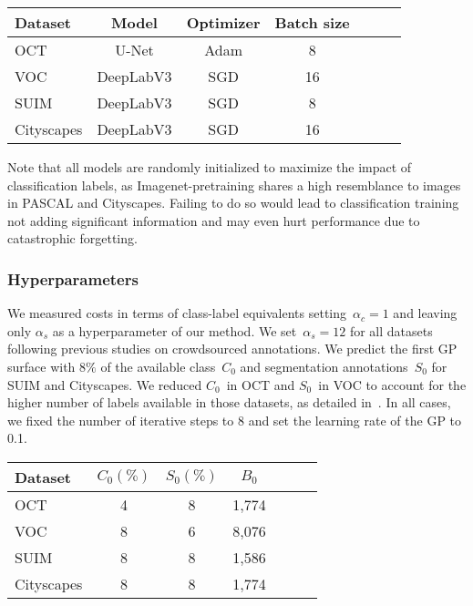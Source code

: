 \begin{table}
\centering
\begin{tabular}{lcccccc}
\toprule
\textbf{Dataset} & \textbf{Model} &  \textbf{Optimizer} & \textbf{Batch size} \\ \midrule
OCT & U-Net &  Adam & 8  \\
VOC & DeepLabV3 &  SGD & 16 \\
SUIM & DeepLabV3 &  SGD & 8  \\ 
Cityscapes & DeepLabV3 & SGD & 16   \\ \bottomrule
\end{tabular}
\end{table}

Note that all models are randomly initialized to maximize the impact of classification labels, as Imagenet-pretraining shares a high resemblance to images in PASCAL and Cityscapes. Failing to do so would lead to classification training not adding significant information and may even hurt performance due to catastrophic forgetting.

\subsubsection{Hyperparameters}
We measured costs in terms of class-label equivalents setting~$\alpha_c=1$ and leaving only $\alpha_s$ as a hyperparameter of our method. We set~$\alpha_s=12$ for all datasets following previous studies on crowdsourced annotations. We predict the first GP surface with $8\%$ of the available class~$C_0$ and segmentation annotations~$S_0$ for SUIM and Cityscapes. We reduced $C_0$~in OCT and $S_0$~in VOC to account for the higher number of labels available in those datasets, as detailed in~. In all cases, we fixed the number of iterative steps to 8 and set the learning rate of the GP to 0.1.

\begin{table}[h]
\centering
\begin{tabular}{lcccccc}
\toprule
\textbf{Dataset} & $C_0 (\%)$ & $S_0 (\%)$ & $B_0$ \\ \midrule
OCT & 4 & 8 & 1,774 \\
VOC & 8 & 6 & 8,076 \\
SUIM & 8 & 8 & 1,586 \\ 
Cityscapes & 8 & 8 & 1,774  \\ \bottomrule
\end{tabular}
\end{table}

